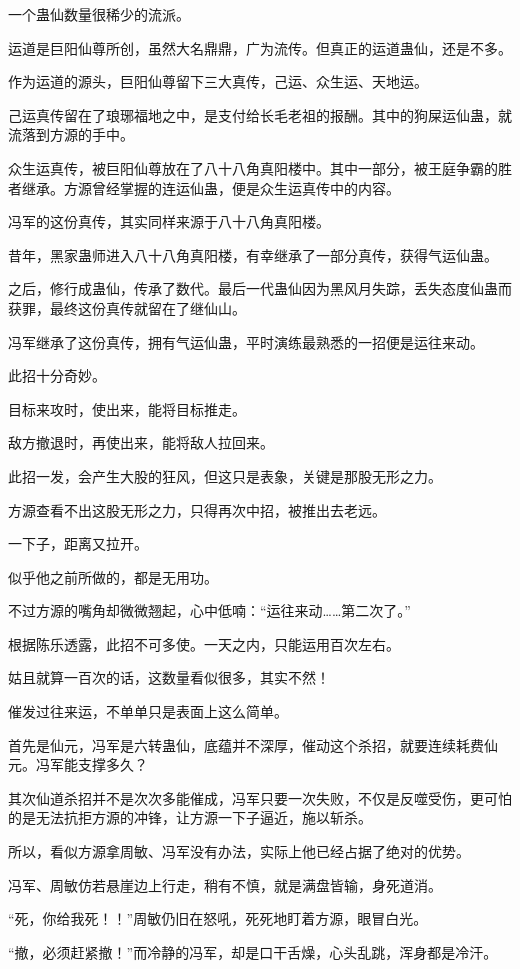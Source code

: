 \begin{this_body}
一个蛊仙数量很稀少的流派。

运道是巨阳仙尊所创，虽然大名鼎鼎，广为流传。但真正的运道蛊仙，还是不多。

作为运道的源头，巨阳仙尊留下三大真传，己运、众生运、天地运。

己运真传留在了琅琊福地之中，是支付给长毛老祖的报酬。其中的狗屎运仙蛊，就流落到方源的手中。

众生运真传，被巨阳仙尊放在了八十八角真阳楼中。其中一部分，被王庭争霸的胜者继承。方源曾经掌握的连运仙蛊，便是众生运真传中的内容。

冯军的这份真传，其实同样来源于八十八角真阳楼。

昔年，黑家蛊师进入八十八角真阳楼，有幸继承了一部分真传，获得气运仙蛊。

之后，修行成蛊仙，传承了数代。最后一代蛊仙因为黑风月失踪，丢失态度仙蛊而获罪，最终这份真传就留在了继仙山。

冯军继承了这份真传，拥有气运仙蛊，平时演练最熟悉的一招便是运往来动。

此招十分奇妙。

目标来攻时，使出来，能将目标推走。

敌方撤退时，再使出来，能将敌人拉回来。

此招一发，会产生大股的狂风，但这只是表象，关键是那股无形之力。

方源查看不出这股无形之力，只得再次中招，被推出去老远。

一下子，距离又拉开。

似乎他之前所做的，都是无用功。

不过方源的嘴角却微微翘起，心中低喃：“运往来动……第二次了。”

根据陈乐透露，此招不可多使。一天之内，只能运用百次左右。

姑且就算一百次的话，这数量看似很多，其实不然！

催发过往来运，不单单只是表面上这么简单。

首先是仙元，冯军是六转蛊仙，底蕴并不深厚，催动这个杀招，就要连续耗费仙元。冯军能支撑多久？

其次仙道杀招并不是次次多能催成，冯军只要一次失败，不仅是反噬受伤，更可怕的是无法抗拒方源的冲锋，让方源一下子逼近，施以斩杀。

所以，看似方源拿周敏、冯军没有办法，实际上他已经占据了绝对的优势。

冯军、周敏仿若悬崖边上行走，稍有不慎，就是满盘皆输，身死道消。

“死，你给我死！！”周敏仍旧在怒吼，死死地盯着方源，眼冒白光。

“撤，必须赶紧撤！”而冷静的冯军，却是口干舌燥，心头乱跳，浑身都是冷汗。

\end{this_body}


